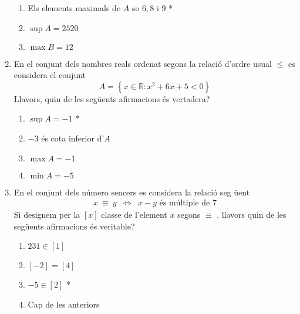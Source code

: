 \begin{enumerate}
\begin{enumerate}
\item Els elements maximals de $A$ so $6,8$ i $9$ *

\item $\sup A=2520$

\item $\max B=12$
\end{enumerate}

\item En el conjunt dels nombres reals ordenat segons la relaci\'{o} d'ordre
usual $\leq$ es considera el conjunt%
\begin{equation*}
A=\left\{ x\in\mathbb{R}:x^{2}+6x+5<0\right\}
\end{equation*}
Llavors, quin de les seg\"{u}ents afirmacions \'{e}s vertadera?

\begin{enumerate}
\item $\sup A=-1$ *

\item $-3$ \'{e}s cota inferior d'$A$

\item $\max A=-1$

\item $\min A=-5$
\end{enumerate}

\item En el conjunt dels n\'{u}mero sencers es considera la relaci\'{o} seg%
\"{u}ent%
\begin{equation*}
\begin{array}{ccc}
x~\equiv~y & \Longleftrightarrow & x-y\text{ \'{e}s m\'{u}ltiple de }7%
\end{array}%
\end{equation*}
Si designem per la $\left[ x\right] $ classe de l'element $x$ segons $\equiv$%
, llavors quin de les seg\"{u}ents afirmacions \'{e}s veritable?

\begin{enumerate}
\item $231\in\left[ 1\right] $

\item $\left[ -2\right] =\left[ 4\right] $

\item $-5\in \left[ 2\right] $ *

\item Cap de les anteriors
\end{enumerate}
\end{enumerate}

